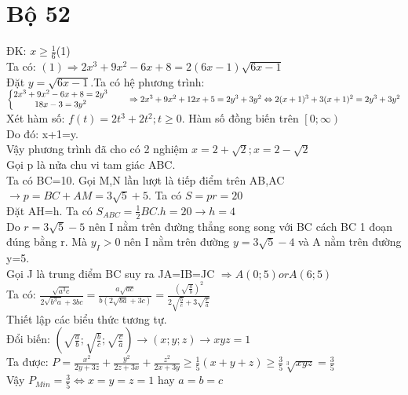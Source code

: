 \section{Bộ 52}
\hda 
ĐK: $x\geq \frac{1}{6}$\hspace{7mm}(1)\\
Ta có: $(1)\Rightarrow2x^{3}+9x^{2}-6x+8=2(6x-1)\sqrt{6x-1}$\\
Đặt $y=\sqrt{6x-1}$.Ta có hệ phương trình:\\
$\left\{\begin{matrix}
2x^{3}+9x^{2}-6x+8=2y^{3} &  & \\ 
18x-3=3y^{2} &  & 
\end{matrix}\right.\\
\Rightarrow 2x^{3}+9x^{2}+12x+5=2y^{3}+3y^{2}\\
\Leftrightarrow 2(x+1)^{3}+3(x+1)^{2}=2y^{3}+3y^{2}$\\
Xét hàm số: $f(t)=2t^{3}+2t^{2};t\geq 0$. Hàm số đồng biến trên $\left[0;\infty\right)$\\
Do đó: x+1=y.\\
Vậy phương trình đã cho có 2 nghiệm $x=2+\sqrt{2};x=2-\sqrt{2}$\\
\hda 
Gọi p là nửa chu vi tam giác ABC.\\
Ta có BC=10. Gọi M,N lần lượt là tiếp điểm trên AB,AC$\rightarrow p=BC+AM=3\sqrt{5}+5$. Ta có $S=pr=20$\\
Đặt AH=h. Ta có $S_{ABC}=\frac{1}{2}BC.h=20\rightarrow h=4$\\
Do $r=3\sqrt{5}-5$ nên I nằm trên đường thẳng song song với BC cách BC 1 đoạn đúng bằng r. Mà $y_{I}>0$ nên I nằm trên đường $y=3\sqrt{5}-4$ và A nằm trên đường y=5.\\ 
Gọi J là trung điểm BC suy ra JA=IB=JC $\Rightarrow A(0;5) or A(6;5)$\\

\hda 
Ta có: $\frac{\sqrt{a^{3}c}}{2\sqrt{b^{3}a}+3bc}=\frac{a\sqrt{ac}}{b(2\sqrt{ba}+3c)}=\frac{(\sqrt{\frac{a}{b}})^{2}}{2\sqrt{\frac{b}{c}}+3\sqrt{\frac{c}{a}}}$\\
Thiết lập các biểu thức tương tự.\\
Đổi biến: $(\sqrt{\frac{a}{b}};\sqrt{\frac{b}{c}};\sqrt{\frac{c}{a}})\rightarrow (x;y;z)\rightarrow xyz=1$\\
Ta được: $P=\frac{x^{2}}{2y+3z}+\frac{y^{2}}{2z+3x}+\frac{z^{2}}{2x+3y}\geq \frac{1}{5}\left ( x+y+z \right )\geq \frac{3}{5}\sqrt[3]{xyz}=\frac{3}{5}$\\
Vậy $P_{Min}=\frac{3}{5}\Leftrightarrow x=y=z=1$ hay $a=b=c$\\

